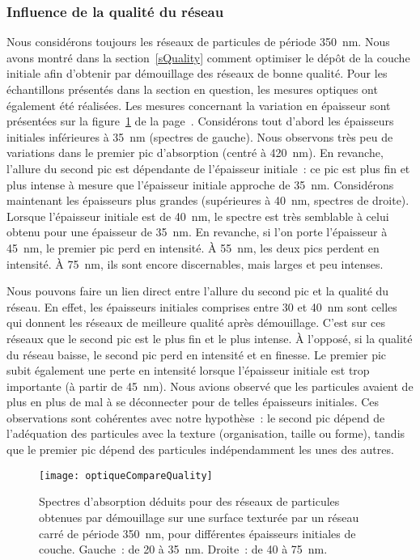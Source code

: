 	\subsubsection{Influence de la qualité du réseau}
Nous considérons toujours les réseaux de particules de période 350~nm. Nous avons montré dans la section~\ref{sQuality} comment optimiser le dépôt de la couche initiale afin d'obtenir par démouillage des réseaux de bonne qualité. Pour les échantillons présentés dans la section en question, les mesures optiques ont également été réalisées. Les mesures concernant la variation en épaisseur sont présentées sur la figure~\ref{optiqueCompareQuality} de la page~\pageref{optiqueCompareQuality}. Considérons tout d'abord les épaisseurs initiales inférieures à 35~nm (spectres de gauche). Nous observons très peu de variations dans le premier pic d'absorption (centré à 420~nm). En revanche, l'allure du second pic est dépendante de l'épaisseur initiale~: ce pic est plus fin et plus intense à mesure que l'épaisseur initiale approche de 35~nm. Considérons maintenant les épaisseurs plus grandes (supérieures à 40~nm, spectres de droite). Lorsque l'épaisseur initiale est de 40~nm, le spectre est très semblable à celui obtenu pour une épaisseur de 35~nm. En revanche, si l'on porte l'épaisseur à 45~nm, le premier pic perd en intensité. À 55~nm, les deux pics perdent en intensité. À 75~nm, ils sont encore discernables, mais larges et peu intenses.\par  
Nous pouvons faire un lien direct entre l'allure du second pic et la qualité du réseau. En effet, les épaisseurs initiales comprises entre 30 et 40~nm sont celles qui donnent les réseaux de meilleure qualité après démouillage. C'est sur ces réseaux que le second pic est le plus fin et le plus intense. À l'opposé, si la qualité du réseau baisse, le second pic perd en intensité et en finesse. Le premier pic subit également une perte en intensité lorsque l'épaisseur initiale est trop importante (à partir de 45~nm). Nous avions observé que les particules avaient de plus en plus de mal à se déconnecter pour de telles épaisseurs initiales. Ces observations sont cohérentes avec notre hypothèse~: le second pic dépend de l'adéquation des particules avec la texture (organisation, taille ou forme), tandis que le premier pic dépend des particules indépendamment les unes des autres.\par 
\begin{figure}[!p]
\centering
\texttt{[image: optiqueCompareQuality]}
\caption{Spectres d’absorption déduits pour des réseaux de particules obtenues par démouillage sur une surface texturée par un réseau carré de période 350~nm, pour différentes épaisseurs initiales de couche. Gauche~: de 20 à 35~nm. Droite~: de 40 à 75~nm.}
\label{optiqueCompareQuality}
\end{figure}
